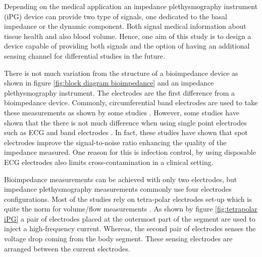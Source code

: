 Depending on the medical application an impedance plethysmography instrument (iPG) device can provide two type of signals, one dedicated to the basal impedance or the dynamic component. Both signal medical information about tissue health and also blood volume. Hence, one aim of this study is to design a device capable of providing both signals and the option of having an additional sensing channel for differential studies in the future.

There is not much variation from the structure of a bioimpedance device as shown in figure \ref{fig:block diagram bioimpedance} and an impedance plethysmography instrument. The electrodes are the first difference from a bioimpedance device. Commonly, circumferential band electrodes are used to take these measurements as shown by some studies \cite{ bera2014bioelectrical, mohapatra1979measurement, yamakoshi1980limb, porter1985measurement, corciova2011peripheral, anderson1984impedance}. However, some studies have shown that the there is not much difference when using single point electrodes such as ECG and band electrodes \cite{qu1986motion, sherwood1991comparison, patterson1991impedance}. In fact, these studies have shown that spot electrodes improve the signal-to-noise ratio enhancing the quality of the impedance measured. One reason for this is infection control, by using disposable ECG electrodes also limits cross-contamination in a clinical setting.

Bioimpedance measurements can be achieved with only two electrodes, but impedance plethysmography measurements commonly use four electrodes configurations. Most of the studies rely on tetra-polar electrodes set-up which is quite the norm for volume/flow measurements \cite{costeloe1980continuous, yamakoshi1980limb, nyboer1974blood, yamamoto1992impedance}. As shown by figure \ref{fig:tetrapolar iPG} a pair of electrodes placed at the outermost part of the segment are used to inject a high-frequency current. Whereas, the second pair of electrodes senses the voltage drop coming from the body segment. These sensing electrodes are arranged between the current electrodes. 

